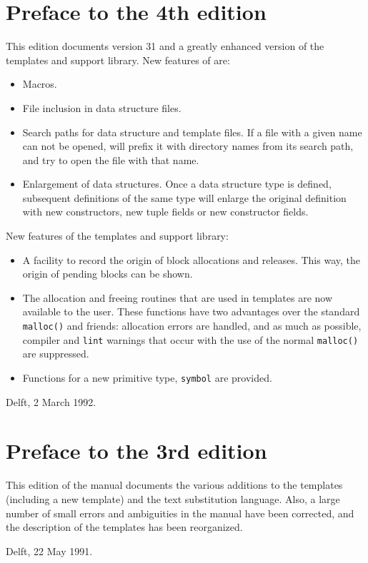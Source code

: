 \section{Preface to the 4th edition}
This edition documents {\Tm} version 31 and a greatly enhanced version
of the {\C} templates and support library.
New features of {\Tm} are:
\begin{itemize}
\item Macros. 
\item File inclusion in data structure files.
\item Search paths for data structure and template files. If a file with
      a given name can not be opened, {\Tm} will prefix it with
      directory names from its search path, and try to open the
      file with that name.
\item Enlargement of data structures. Once a data structure type is defined,
      subsequent definitions of the same type will enlarge the original
      definition with new constructors, new tuple fields or new constructor
      fields.
\end{itemize}
\par
New features of the {\Tm} {\C} templates and support library:
\begin{itemize}
\item A facility to record the origin of {\Tm} block allocations and
      releases. This way, the origin of pending blocks can be shown.
\item The allocation and freeing routines that are used in {\Tm} templates
      are now available to the user. These functions have two advantages
      over the standard \verb+malloc()+ and friends:
      allocation errors are handled,
      and as much as possible, compiler and \verb+lint+ warnings that
      occur with the use of the normal \verb+malloc()+ are suppressed.
\item Functions for a new primitive type, \verb+symbol+ are 
      provided.
\end{itemize}
\begin{flushright}
Delft, 2 March 1992.
\end{flushright}
\section{Preface to the 3rd edition}
This edition of the {\Tm} manual documents the various additions
to the {\C} templates (including a new template)
and the {\Tm} text substitution language.
Also, a large number of small errors and ambiguities in the manual
have been corrected,
and the description of the {\C} templates has been reorganized.
\begin{flushright}
Delft, 22 May 1991.
\end{flushright}
